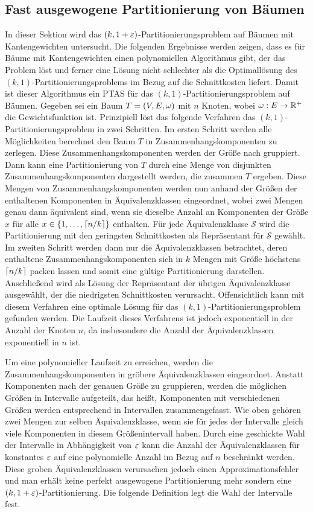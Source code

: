 \subsection{Fast ausgewogene Partitionierung von Bäumen}
In dieser Sektion wird das $(k,1+\eps)$-Partitionierungsproblem auf Bäumen mit Kantengewichten untersucht. 
Die folgenden Ergebnisse werden zeigen, dass es für Bäume mit Kantengewichten einen polynomiellen Algorithmus gibt, der das Problem löst und ferner eine Lösung nicht schlechter als die Optimallösung des $(k,1)$-Partitionierungsproblems im Bezug auf die Schnittkosten liefert.
Damit ist dieser Algorithmus ein  PTAS für das $(k,1)$-Partitionierungsproblem auf Bäumen. 
Gegeben sei ein Baum $T = (V,E,\weight)$ mit $n$ Knoten, wobei $\weight : E \rightarrow \reals^+$ die Gewichtsfunktion ist.
Prinzipiell löst das folgende Verfahren das $(k,1)$-Partitionierungsproblem in zwei Schritten.
Im ersten Schritt werden alle Möglichkeiten berechnet den Baum $T$ in Zusammenhangskomponenten zu zerlegen.
Diese Zusammenhangskomponenten werden der Größe nach gruppiert.
Dann kann eine Partitionierung von $T$ durch eine Menge von disjunkten Zusammenhangskomponenten dargestellt werden, die zusammen $T$ ergeben. 
Diese Mengen von Zusammenhangskomponenten werden nun anhand der Größen der enthaltenen Komponenten in Äquivalenzklassen eingeordnet, wobei zwei Mengen genau dann äquivalent sind, wenn sie dieselbe Anzahl an Komponenten der Größe $x$ für alle $x \in \{1, \ldots, \ceil*{n/k}\}$ enthalten.
Für jede Äquivalenzklasse $\mathcal{S}$ wird die Partitionierung mit den geringsten Schnittkosten als Repräsentant für $\mathcal{S}$ gewählt.
Im zweiten Schritt werden dann nur die Äquivalenzklassen betrachtet, deren enthaltene Zusammenhangskomponenten sich in $k$ Mengen mit Größe höchstens $\ceil*{n/k}$ packen lassen und somit eine gültige Partitionierung darstellen.
Anschließend wird als Lösung der Repräsentant der übrigen Äquivalenzklasse ausgewählt, der die niedrigsten Schnittkosten verursacht.
Offensichtlich kann mit diesem Verfahren eine optimale Lösung für das $(k,1)$-Partitionierungsproblem gefunden werden.
Die Laufzeit dieses Verfahrens ist jedoch exponentiell in der Anzahl der Knoten $n$, da insbesondere die Anzahl der Äquivalenzklassen exponentiell in $n$ ist.

Um eine polynomieller Laufzeit zu erreichen, werden die Zusammenhangskomponenten in gröbere Äquivalenzklassen eingeordnet.
Anstatt Komponenten nach der genauen Größe zu gruppieren, werden die möglichen Größen in Intervalle aufgeteilt, das heißt, Komponenten mit verschiedenen Größen werden entsprechend in Intervallen zusammengefasst. 
Wie oben gehören zwei Mengen zur selben Äquivalenzklasse, wenn sie für jedes der Intervalle gleich viele Komponenten in diesem Größenintervall haben.
Durch eine geschickte Wahl der Intervalle in Abhängigkeit von $\eps$ kann die Anzahl der Äquivalenzklassen für konstantes $\eps$ auf eine polynomielle Anzahl im Bezug auf $n$ beschränkt werden.
Diese groben Äquivalenzklassen verursachen jedoch einen Approximationsfehler und man erhält keine perfekt ausgewogene Partitionierung mehr sondern eine $(k, 1+\eps)$-Partitionierung. Die folgende Definition legt die Wahl der Intervalle fest. \\

